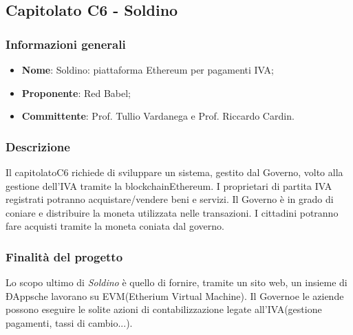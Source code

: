 \subsection{Capitolato C6 - Soldino}

\subsubsection{Informazioni generali}
\begin{itemize}
	\item \textbf {Nome}: Soldino: piattaforma Ethereum per pagamenti IVA;
	\item \textbf {Proponente}: Red Babel;
	\item \textbf {Committente}: Prof. Tullio Vardanega e Prof. Riccardo Cardin.
\end{itemize}

\subsubsection{Descrizione}
Il capitolato\glosp C6 richiede di sviluppare un sistema, gestito dal Governo\glo, volto alla gestione dell'IVA tramite la blockchain\glosp Ethereum\glo. I proprietari di partita IVA registrati potranno acquistare/vendere beni e servizi.
Il Governo è in grado di coniare e distribuire la moneta utilizzata nelle transazioni. I cittadini potranno fare acquisti tramite la moneta coniata dal governo.   

\subsubsection{Finalità del progetto}
Lo scopo ultimo di \textit{Soldino} è quello di fornire, tramite un sito web, un insieme di ÐApps\glosp che lavorano su EVM\glosp (Etherium Virtual Machine). Il Governo\glosp e le aziende possono eseguire le solite azioni di contabilizzazione legate all'IVA\glosp (gestione pagamenti, tassi di cambio...).  

